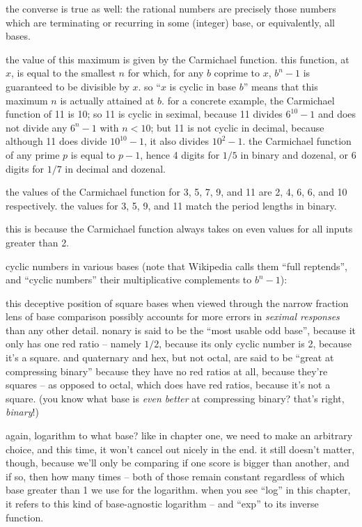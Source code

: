 \documentclass[../footnotes.tex]{subfiles}
\begin{document}

\myfootnote{} the converse is true as well: the rational numbers are precisely those numbers which are terminating or recurring in some (integer) base, or equivalently, all bases.

\myfootnote{} the value of this maximum is given by the Carmichael function. this function, at $x$, is equal to the smallest $n$ for which, for any $b$ coprime to $x$, $b^n - 1$ is guaranteed to be divisible by $x$. so ``$x$ is cyclic in base $b$'' means that this maximum $n$ is actually attained at $b$. for a concrete example, the Carmichael function of 11 is 10; so 11 is cyclic in seximal, because 11 divides $6^{10} - 1$ and does not divide any $6^n - 1$ with $n < 10$; but 11 is not cyclic in decimal, because although 11 does divide $10^{10} - 1$, it also divides $10^2 - 1$. the Carmichael function of any prime $p$ is equal to $p - 1$, hence 4 digits for $1/5$ in binary and dozenal, or 6 digits for $1/7$ in decimal and dozenal.

\myfootnote{} the values of the Carmichael function for 3, 5, 7, 9, and 11 are 2, 4, 6, 6, and 10 respectively. the values for 3, 5, 9, and 11 match the period lengths in binary.

\myfootnote{} this is because the Carmichael function always takes on even values for all inputs greater than 2.

\myfootnote{} cyclic numbers in various bases (note that Wikipedia calls them ``full reptends'', and ``cyclic numbers'' their multiplicative complements to $b^n - 1$): \\

\myfootnote{} this deceptive position of square bases when viewed through the narrow fraction lens of base comparison possibly accounts for more errors in {\it seximal responses} than any other detail. nonary is said to be the ``most usable odd base'', because it only has one red ratio -- namely $1/2$, because its only cyclic number is 2, because it's a square. and quaternary and hex, but not octal, are said to be ``great at compressing binary'' because they have no red ratios at all, because they're squares -- as opposed to octal, which does have red ratios, because it's not a square. (you know what base is \emph{even better} at compressing binary? that's right, \emph{binary}!)

\myfootnote{} again, logarithm to what base? like in chapter one, we need to make an arbitrary choice, and this time, it won't cancel out nicely in the end. it still doesn't matter, though, because we'll only be comparing if one score is bigger than another, and if so, then how many times -- both of those remain constant regardless of which base greater than 1 we use for the logarithm. when you see ``log'' in this chapter, it refers to this kind of base-agnostic logarithm -- and ``exp'' to its inverse function.
\end{document}
